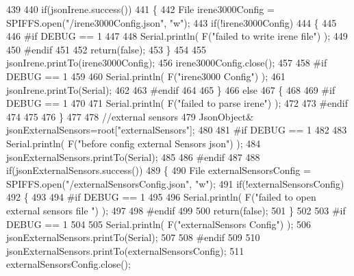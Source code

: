 \begin{DoxyCode}
439 
440     \textcolor{keywordflow}{if}(jsonIrene.success())
441     \{
442         File irene3000Config = SPIFFS.open(\textcolor{stringliteral}{"/irene3000Config.json"}, \textcolor{stringliteral}{"w"});   
443         \textcolor{keywordflow}{if}(!irene3000Config)
444         \{
445 
446 \textcolor{preprocessor}{        #if DEBUG == 1 }
447 
448             Serial.println( F(\textcolor{stringliteral}{"failed to write irene file"}) );
449         
450 \textcolor{preprocessor}{        #endif}
451 
452             \textcolor{keywordflow}{return}(\textcolor{keyword}{false});
453         \}
454 
455         jsonIrene.printTo(irene3000Config);
456         irene3000Config.close();
457     
458 \textcolor{preprocessor}{    #if DEBUG == 1 }
459         
460         Serial.println( F(\textcolor{stringliteral}{"irene3000 Config"}) );
461         jsonIrene.printTo(Serial);
462     
463 \textcolor{preprocessor}{    #endif}
464     
465     \}
466     \textcolor{keywordflow}{else}
467     \{
468     
469 \textcolor{preprocessor}{    #if DEBUG == 1 }
470 
471         Serial.println( F(\textcolor{stringliteral}{"failed to parse irene"}) );   
472     
473 \textcolor{preprocessor}{    #endif }
474 
475 
476     \}
477     
478     \textcolor{comment}{//external sensors}
479         JsonObject& jsonExternalSensors=root[\textcolor{stringliteral}{"externalSensors"}];
480 
481 \textcolor{preprocessor}{#if DEBUG == 1 }
482 
483     Serial.println( F(\textcolor{stringliteral}{"before config external Sensors json"}) );
484     jsonExternalSensors.printTo(Serial);
485 
486 \textcolor{preprocessor}{#endif}
487 
488     \textcolor{keywordflow}{if}(jsonExternalSensors.success())
489     \{
490         File externalSensorsConfig = SPIFFS.open(\textcolor{stringliteral}{"/externalSensorsConfig.json"}, \textcolor{stringliteral}{"w"});   
491         \textcolor{keywordflow}{if}(!externalSensorsConfig)
492         \{
493         
494 \textcolor{preprocessor}{        #if DEBUG == 1 }
495 
496             Serial.println( F(\textcolor{stringliteral}{"failed to open external sensors file "}) );
497         
498 \textcolor{preprocessor}{        #endif }
499 
500             \textcolor{keywordflow}{return}(\textcolor{keyword}{false});
501         \}
502 
503 \textcolor{preprocessor}{#if DEBUG == 1 }
504         
505         Serial.println( F(\textcolor{stringliteral}{"externalSensors Config"}) );
506         jsonExternalSensors.printTo(Serial);
507 
508 \textcolor{preprocessor}{#endif }
509 
510         jsonExternalSensors.printTo(externalSensorsConfig); 
511         externalSensorsConfig.close();

\end{DoxyCode}
